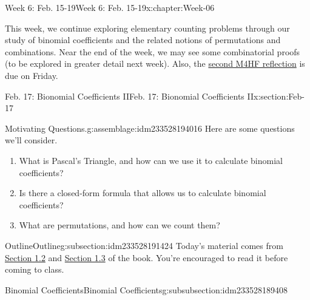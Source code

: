 \documentclass[oneside,10pt,]{book}
\numberwithin{equation}{section}
\begin{document}
\begin{chapterptx}{Week 6: Feb. 15-19}{}{Week 6: Feb. 15-19}{}{}{x:chapter:Week-06}
\begin{introduction}{}%
This week, we continue exploring elementary counting problems through our study of binomial coefficients and the related notions of permutations and combinations. Near the end of the week, we may see some combinatorial proofs (to be explored in greater detail next week). Also, the \href{}{second M4HF reflection} is due on Friday.%
\end{introduction}%
%
%
\typeout{************************************************}
\typeout{************************************************}
%
\begin{sectionptx}{Feb. 17: Bionomial Coefficients II}{}{Feb. 17: Bionomial Coefficients II}{}{}{x:section:Feb-17}
\begin{introduction}{}%
\begin{assemblage}{Motivating Questions.}{g:assemblage:idm233528194016}%
Here are some questions we'll consider. %
\begin{enumerate}
\item{}What is Pascal's Triangle, and how can we use it to calculate binomial coefficients?%
\item{}Is there a closed-form formula that allows us to calculate binomial coefficients?%
\item{}What are permutations, and how can we count them?%
\end{enumerate}
%
\end{assemblage}
\end{introduction}%
%
%
\typeout{************************************************}
\typeout{************************************************}
%
\begin{subsectionptx}{Outline}{}{Outline}{}{}{g:subsection:idm233528191424}
Today's material comes from \href{http://discrete.openmathbooks.org/dmoi3/sec_counting-binom.html}{Section 1.2} and \href{http://discrete.openmathbooks.org/dmoi3/sec_counting-combperm.html}{Section 1.3} of the book. You're encouraged to read it before coming to class.%
%
%
\typeout{************************************************}
\typeout{************************************************}
%
\begin{subsubsectionptx}{Binomial Coefficients}{}{Binomial Coefficients}{}{}{g:subsubsection:idm233528189408}

\end{subsubsectionptx}
\end{subsectionptx}
\end{sectionptx}
\end{chapterptx}
\end{document}
